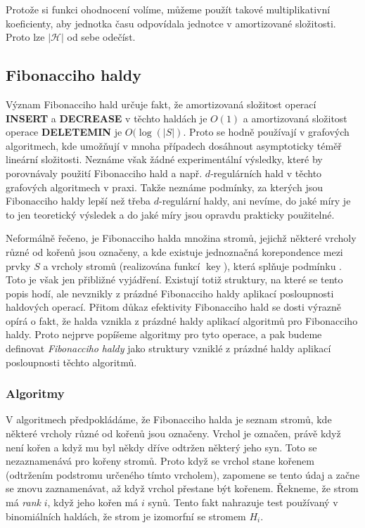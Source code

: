 \documentclass[a4paper,12pt]{article}
\DeclareMathOperator*{\key}{key}
\begin{document}
Protože si funkci ohodnocení volíme, 
můžeme použít takové multiplikativní 
koeficienty, aby jednotka času odpovídala jednotce v 
amortizované složitosti. Proto lze $|\mathcal H|$ od sebe odečíst.

\subsection{{Fibonacciho haldy}}

Význam Fibonacciho hald určuje fakt, že amortizovaná 
složitost operací {\bf INSERT} a {\bf DECREASE} v těchto haldách je 
$O(1)$ a amortizovaná složitost operace {\bf DELETEMIN} je $
O(\log(|S|)$. 
Proto se hodně používají v grafových algoritmech, 
kde umožňují v mnoha případech dosáhnout asymptoticky téměř lineární 
složitosti. Neznáme však žádné  
expe\-rimentální výsledky, které by porovnávaly použití Fibonacciho 
hald a např. $d$-regulárních hald v těchto grafových 
algoritmech v praxi. Takže neznáme podmínky, za 
kterých jsou Fibonacciho 
haldy lepší než třeba $d$-regulární haldy, 
ani nevíme, do jaké míry je to jen teoretický 
výsledek a do jaké míry jsou opravdu prakticky použitelné. 

Neformálně řečeno, je Fibonacciho halda množina 
stromů, jejichž některé vrcholy různé od 
kořenů jsou označeny, a kde existuje 
jednoznačná korepondence mezi prvky $S$ a vrcholy 
stromů (realizována funkcí $\key$), která splňuje 
podmínku .  Toto je však jen přibliž\-né 
vyjádření.  Existují totiž struktury, na které se tento 
popis hodí, ale 
nevznikly z prázd\-né Fibonacciho haldy aplikací 
posloupnosti haldových  
operací.  Přitom důkaz efekti\-vity Fibonacciho hald se 
dosti výrazně opírá o fakt, že halda vznikla z prázdné 
haldy aplikací algoritmů pro Fibonacciho 
haldy. Proto nejprve popíšeme algoritmy pro tyto 
ope\-race, a pak budeme
definovat \emph{Fibonacciho} \emph{haldy} jako struktury 
vzniklé z prázdné haldy aplikací posloupnosti 
těchto algoritmů.

\subsubsection{Algoritmy}

V algoritmech předpokládáme, že Fibonacciho halda je 
seznam stromů, kde některé vrcholy různé od 
kořenů jsou označeny.  Vrchol je označen, právě když není 
kořen a když mu byl někdy dříve odtržen některý jeho syn. Toto se 
nezaznamenává pro kořeny stromů. Proto když se 
vrchol stane kořenem (odtržením podstromu určeného 
tímto vrcholem),  
zapomene  se tento údaj a začne se znovu zaznamenávat, 
až když vrchol přestane 
být kořenem. Řekneme, že strom má \emph{rank} $i$, když 
jeho kořen 
má $i$ synů. Tento fakt nahrazuje test používaný 
v binomiálních 
haldách, že strom je izomorfní se stromem $H_i$. 
\end{document}
